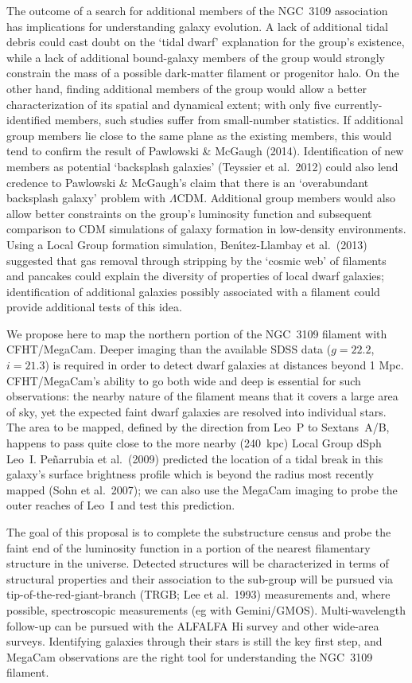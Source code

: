 The outcome of a search for additional members of the NGC~3109 association has  implications for
understanding galaxy evolution. A lack of additional tidal debris could cast doubt on the `tidal dwarf' 
explanation for the group's existence, while a lack of additional bound-galaxy members of the group 
would strongly constrain the mass of a possible dark-matter filament or progenitor halo.
On the other hand, finding additional members of the group would allow a better characterization of its
spatial and dynamical extent; with only five currently-identified members, such studies 
suffer from small-number statistics. If additional group members lie close to the same plane
as the existing members, this would tend to confirm the result of Pawlowski \& McGaugh (2014). 
Identification of new members as potential `backsplash galaxies' (Teyssier et al.\ 2012) could also lend credence to 
Pawlowski \& McGaugh's claim that there is an `overabundant backsplash galaxy' problem with $\Lambda$CDM.
Additional group members 
would also allow better constraints on the group's  luminosity function and subsequent comparison to CDM 
simulations of galaxy formation in  low-density environments.
Using a Local Group formation simulation, Ben{\'{\i}}tez-Llambay et al.\ (2013) suggested that gas removal through 
stripping by the `cosmic web' of filaments and pancakes could explain the diversity of properties of local dwarf galaxies;
identification of additional galaxies possibly associated with a filament could provide additional tests of this idea.


We propose here to map the northern portion of  the NGC~3109 filament with CFHT/MegaCam. 
Deeper imaging than the available  SDSS  data ($g=22.2$, $i=21.3$) is required in order to detect dwarf galaxies at distances beyond 1 Mpc.
CFHT/MegaCam's ability to go both wide and deep is essential for such observations: the nearby nature of the 
filament means that it covers a large area of sky, yet the expected faint dwarf galaxies are resolved into individual stars.
The area to be mapped, defined  by the direction from Leo~P to Sextans~A/B, happens to pass quite close
to the more nearby (240~kpc) Local Group dSph Leo~I. Pe{\~n}arrubia et al.\ (2009) predicted the location
of a tidal break in this galaxy's surface brightness profile which is beyond the radius most recently mapped (Sohn et al.\ 2007);
we can also use the MegaCam imaging to probe the outer reaches of Leo~I and test this prediction.

The goal of this proposal is to complete the substructure census and probe the faint end of the luminosity function in 
a portion of the nearest filamentary structure in the universe. Detected structures will be characterized in terms of 
structural properties and their association to the sub-group will be pursued via tip-of-the-red-giant-branch 
(TRGB; Lee et al.\ 1993) measurements and, where possible, spectroscopic measurements (eg with Gemini/GMOS). 
Multi-wavelength follow-up can be pursued with the ALFALFA H{\sc i} survey and other wide-area surveys.
Identifying galaxies through their stars is still the key first step, and MegaCam observations are the right tool
for understanding the NGC~3109 filament.



